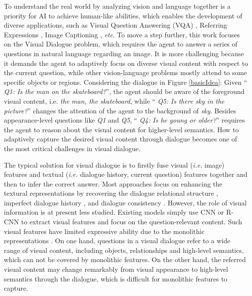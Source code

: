 \documentclass[letterpaper]{article} \usepackage{aaai20}  \usepackage{times}  \usepackage{helvet} \usepackage{courier}  \usepackage[hyphens]{url}  \usepackage{graphicx} \urlstyle{rm} \def\UrlFont{\rm}  \usepackage{graphicx}  \frenchspacing  \setlength{\pdfpagewidth}{8.5in}  \setlength{\pdfpageheight}{11in}  \usepackage{mathrsfs} \usepackage{amsfonts,amssymb}  \usepackage{tabularx} \usepackage{url}
\begin{document}
To understand the real world by analyzing vision and language together is a priority for AI to achieve human-like abilities, which enables the development of diverse applications, such as Visual Question Answering (VQA) \cite{Agrawal2017VQA}, Referring Expressions \cite{Wang2019Neighbourhood}, Image Captioning \cite{johnson2016densecap}, \emph{etc}. To move a step further, this work focuses on the Visual Dialogue \cite{Das2017Visual} problem, which requires the agent to answer a series of questions in natural language regarding an image. It is more challenging because it demands the agent to adaptively focus on diverse visual content with respect to the current question, while other vision-language problems mostly attend to some specific objects or regions. Considering the dialogue in Figure \ref{basicIdea}: Given `` \emph{Q1: Is the man on the skateboard?}'', the agent should be aware of the foreground visual content, i.e. \emph{the man, the skateboard}, while `` \emph{Q5: Is there sky in the picture?}'' changes the attention of the agent to the background of \emph{sky}. Besides appearance-level questions like \emph{Q1} and \emph{Q5}, `` \emph{Q4: Is he young or older?}'' requires the agent to reason about the visual content for higher-level semantics. How to adaptively capture the desired visual content through dialogue becomes one of the most critical challenges in visual dialogue.  


The typical solution for visual dialogue is to firstly fuse visual (\emph{i.e.} image) features and textual (\emph{i.e.} dialogue history, current question) features together and then to infer the correct answer. Most approaches focus on enhancing the textural representations by recovering the dialogue relational structure \cite{Zheng2019Reasoning}, imperfect dialogue history \cite{yang2019making}, and dialogue consistency \cite{wu2018areyou}. However, the role of visual information is at present less studied. Existing models simply use CNN \cite{Simonyan2014Very} or R-CNN \cite{Ren2017Faster} to extract visual features and focus on the question-relevant content. Such visual features have limited expressive ability due to the monolithic representations \cite{Wang2019Neighbourhood}. On one hand, questions in a visual dialogue refer to a wide range of visual content, including objects, relationships and high-level semantics, which can not be covered by monolithic features. On the other hand, the referred visual content may change remarkably from visual appearance to high-level semantics through the dialogue, which is difficult for monolithic features to capture. 
\end{document}
